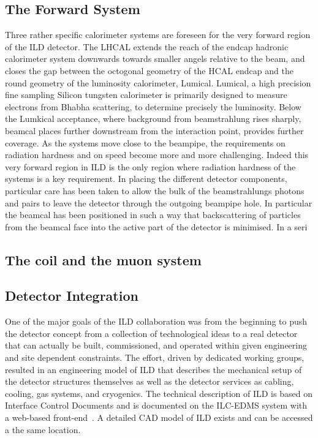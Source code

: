 \documentclass[%
 amsmath,amssymb,
 aps,
]{revtex4-1}
\begin{document}
\subsection{The Forward System}
Three rather specific calorimeter systems are foreseen for the very forward region of the ILD detector. The LHCAL extends the reach of the endcap hadronic calorimeter system downwards towards smaller angels relative to the beam, and closes the gap between the octogonal geometry of the HCAL endcap and the round geometry of the luminosity calorimeter, Lumical. Lumical, a high precision fine sampling Silicon tungsten calorimeter is primarily designed to measure electrons from Bhabha scattering, to determine precisely the luminosity. Below the Lumkical acceptance, where background from beamstrahlung rises sharply, beamcal places further downstream from the interaction point, provides further coverage. As the systems move close to the beampipe, the requirements on radiation hardness and on speed become more and more challenging. Indeed this very forward region in ILD is the only region where radiation hardness of the systems is a key requirement. In placing the different detector components, particular care has been taken to allow the bulk of the beamstrahlungs photons and pairs to leave the detector through the outgoing beampipe hole. In particular the beamcal has been positioned in such a way that backscattering of particles from the beamcal face into the active part of the detector is minimised. 
In a seri

\subsection{The coil and the muon system}

\subsection{Detector Integration}
One of the major goals of the ILD collaboration was from the beginning to push the detector concept from a collection of technological ideas to a real detector that can actually be built, commissioned, and operated within given engineering and site dependent constraints. The effort, driven by dedicated working groups, resulted in an engineering model of ILD that describes the mechanical setup of the detector structures themselves as well as the detector services as cabling, cooling, gas systems, and cryogenics. The technical description of ILD is based on Interface Control Documents and is documented on the ILC-EDMS system with a web-based front-end~\cite{EDMS}. A detailed CAD model of ILD exists and can be accessed a the same location.
\end{document}
